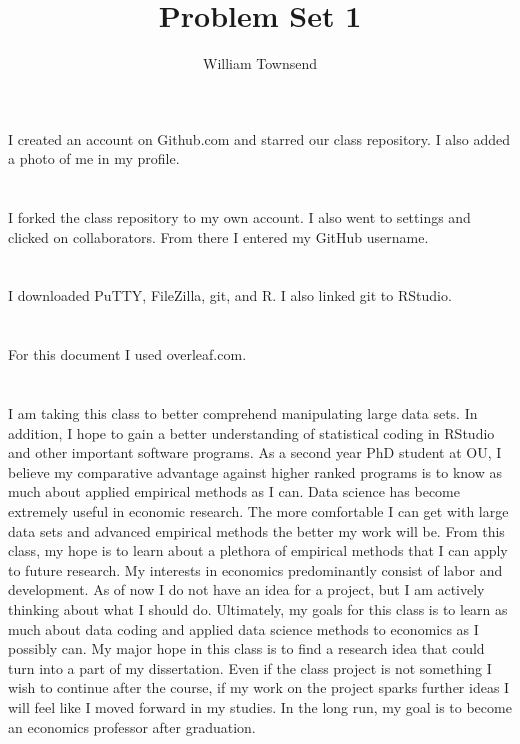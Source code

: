 \documentclass{article}
\title{Problem Set 1}
\author{William Townsend}
\begin{document}
\maketitle


\section{}

I created an account on Github.com and starred our class repository. I also added a photo of me in my profile.



\section{}

I forked the class repository to my own account. I also went to settings and clicked on collaborators. From there I entered my GitHub username.

\section{}

I downloaded PuTTY, FileZilla, git, and R. I also linked git to RStudio.

\section{}

For this document I used overleaf.com.

\section{}

I am taking this class to better comprehend manipulating large data sets. In addition, I hope to gain a better understanding of statistical coding in RStudio and other important software programs. As a second year PhD student at OU, I believe my comparative advantage against higher ranked programs is to know as much about applied empirical methods as I can. Data science has become extremely useful in economic research. The more comfortable I can get with large data sets and advanced empirical methods the better my work will be. From this class, my hope is to learn about a plethora of empirical methods that I can apply to future research. My interests in economics predominantly consist of labor and development. As of now I do not have an idea for a project, but I am actively thinking about what I should do. Ultimately, my goals for this class is to learn as much about data coding and applied data science methods to economics as I possibly can. My major hope in this class is to find a research idea that could turn into a part of my dissertation. Even if the class project is not something I wish to continue after the course, if my work on the project sparks further ideas I will feel like I moved forward in my studies. In the long run, my goal is to become an economics professor after graduation.
\end{document}
